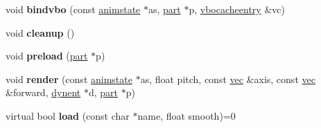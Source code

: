 \begin{DoxyCompactItemize}
\item 
\mbox{\label{structvertmodel_1_1vertmeshgroup_a323e7f9362b124c45a60d0197349fd85}} 
void {\bfseries bindvbo} (const \hyperlink{structanimmodel_1_1animstate}{animstate} $\ast$as, \hyperlink{structanimmodel_1_1part}{part} $\ast$p, \hyperlink{structvertmodel_1_1vbocacheentry}{vbocacheentry} \&vc)
\item 
\mbox{\label{structvertmodel_1_1vertmeshgroup_a0974ca4dc57231d2b4cca06b5e7c375b}} 
void {\bfseries cleanup} ()
\item 
\mbox{\label{structvertmodel_1_1vertmeshgroup_aadd0f3c512e71331a52bac0df1f4aac3}} 
void {\bfseries preload} (\hyperlink{structanimmodel_1_1part}{part} $\ast$p)
\item 
\mbox{\label{structvertmodel_1_1vertmeshgroup_a0439dd8eca12753860aca81dbfbe8700}} 
void {\bfseries render} (const \hyperlink{structanimmodel_1_1animstate}{animstate} $\ast$as, float pitch, const \hyperlink{structvec}{vec} \&axis, const \hyperlink{structvec}{vec} \&forward, \hyperlink{structdynent}{dynent} $\ast$d, \hyperlink{structanimmodel_1_1part}{part} $\ast$p)
\item 
\mbox{\label{structvertmodel_1_1vertmeshgroup_aa9d1e9e207d313ff9ebee7c701dd51ee}} 
virtual bool {\bfseries load} (const char $\ast$name, float smooth)=0
\end{DoxyCompactItemize}
